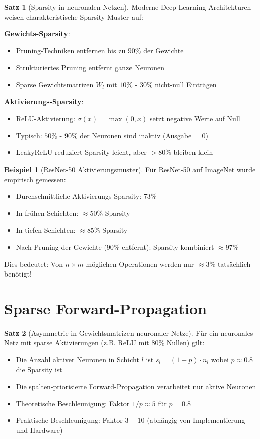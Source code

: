 \documentclass[a4paper,12pt]{report}
\theoremstyle{definition}
\newtheorem{beispiel}{Beispiel}
\newtheorem{satz}{Satz}
\begin{document}
	\begin{satz}[Sparsity in neuronalen Netzen]
		Moderne Deep Learning Architekturen weisen charakteristische Sparsity-Muster auf:
		
		\textbf{Gewichts-Sparsity}:
		\begin{itemize}
			\item Pruning-Techniken entfernen bis zu 90\% der Gewichte
			\item Strukturiertes Pruning entfernt ganze Neuronen
			\item Sparse Gewichtsmatrizen $W_l$ mit $10\%$ - $30\%$ nicht-null Einträgen
		\end{itemize}
		
		\textbf{Aktivierungs-Sparsity}:
		\begin{itemize}
			\item ReLU-Aktivierung: $\sigma(x) = \max(0, x)$ setzt negative Werte auf Null
			\item Typisch: $50\%$ - $90\%$ der Neuronen sind inaktiv (Ausgabe = 0)
			\item LeakyReLU reduziert Sparsity leicht, aber $>80\%$ bleiben klein
		\end{itemize}
	\end{satz}
	
	\begin{beispiel}[ResNet-50 Aktivierungsmuster]
		Für ResNet-50 auf ImageNet wurde empirisch gemessen:
		\begin{itemize}
			\item Durchschnittliche Aktivierungs-Sparsity: 73\%
			\item In frühen Schichten: $\approx 50\%$ Sparsity
			\item In tiefen Schichten: $\approx 85\%$ Sparsity
			\item Nach Pruning der Gewichte (90\% entfernt): Sparsity kombiniert $\approx 97\%$
		\end{itemize}
		
		Dies bedeutet: Von $n \times m$ möglichen Operationen werden nur $\approx 3\%$ tatsächlich benötigt!
	\end{beispiel}
	
	\section{Sparse Forward-Propagation}
	
	\begin{satz}[Asymmetrie in Gewichtsmatrizen neuronaler Netze]
		Für ein neuronales Netz mit sparse Aktivierungen (z.B. ReLU mit 80\% Nullen) gilt:
		\begin{itemize}
			\item Die Anzahl aktiver Neuronen in Schicht $l$ ist $s_l = (1-p) \cdot n_l$ wobei $p \approx 0.8$ die Sparsity ist
			\item Die spalten-priorisierte Forward-Propagation verarbeitet nur aktive Neuronen
			\item Theoretische Beschleunigung: Faktor $1/p \approx 5$ für $p = 0.8$
			\item Praktische Beschleunigung: Faktor $3-10$ (abhängig von Implementierung und Hardware)
		\end{itemize}
	\end{satz}
	
\end{document}

